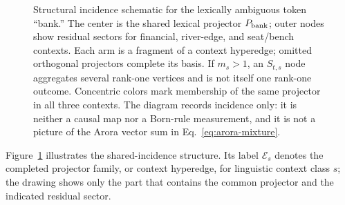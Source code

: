\documentclass[
  aps,
  reprint,
  superscriptaddress,
  floatfix,
  nofootinbib,
  longbibliography
]{revtex4-2}
\begin{document}
\begin{figure}[t]
\centering
{}
\caption{%
Structural incidence schematic for the lexically ambiguous token ``bank.''
The center is the shared lexical projector $P_{\rm bank}$; outer nodes show
residual sectors for financial, river-edge, and seat/bench contexts.  Each arm
is a fragment of a context hyperedge; omitted orthogonal projectors complete
its basis.  If $m_s>1$, an $S_{t,s}$ node aggregates several rank-one vertices
and is not itself one rank-one outcome.  Concentric colors mark membership of
the same projector in all three contexts.  The diagram records incidence only:
it is neither a causal map nor a Born-rule measurement, and it is not a picture
of the Arora vector sum in Eq.~\eqref{eq:arora-mixture}.
}
\label{fig:reference-subspace}
\end{figure}

Figure~\ref{fig:reference-subspace} illustrates the shared-incidence structure.
Its label $\mathcal E_s$ denotes the completed projector family, or context
hyperedge, for linguistic context class $s$; the drawing shows only the part
that contains the common projector and the indicated residual sector.
\end{document}
